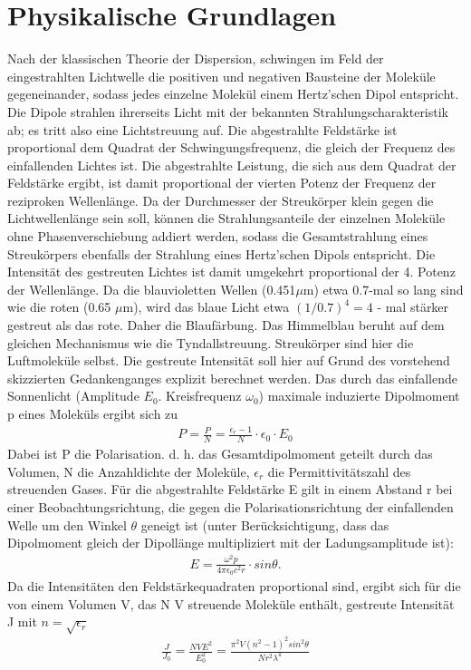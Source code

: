 \section{Physikalische Grundlagen}

Nach der klassischen Theorie der Dispersion, schwingen im Feld der eingestrahlten Lichtwelle die positiven und negativen Bausteine der Moleküle gegeneinander, sodass jedes einzelne Molekül einem Hertz'schen Dipol entspricht. Die Dipole strahlen ihrerseits Licht mit der bekannten Strahlungscharakteristik ab; es tritt also eine Lichtstreuung auf. Die abgestrahlte Feldstärke ist proportional dem Quadrat der Schwingungsfrequenz, die gleich der Frequenz des einfallenden Lichtes ist. Die abgestrahlte Leistung, die sich aus dem Quadrat der Feldstärke ergibt, ist damit proportional der vierten Potenz der Frequenz der reziproken Wellenlänge.
Da der Durchmesser der Streukörper klein gegen die Lichtwellenlänge sein soll, können die Strahlungsanteile der einzelnen Moleküle ohne Phasenverschiebung addiert werden, sodass die Gesamtstrahlung eines Streukörpers ebenfalls der Strahlung eines Hertz'schen Dipols entspricht. Die Intensität des gestreuten Lichtes ist damit umgekehrt proportional der 4. Potenz der Wellenlänge. Da die blauvioletten Wellen (0.451$\mu$m) etwa 0.7-mal so lang sind wie die roten (0.65 $\mu$m), wird das blaue Licht etwa $(1/0.7)^4 =4$ - mal stärker gestreut als das rote. Daher die Blaufärbung.
Das Himmelblau beruht auf dem gleichen Mechanismus wie die Tyndallstreuung.
Streukörper sind hier die Luftmoleküle selbst. Die gestreute Intensität soll hier auf Grund des vorstehend skizzierten Gedankenganges explizit berechnet werden.
Das durch das einfallende Sonnenlicht (Amplitude $E_0$. Kreisfrequenz $\omega_0$) maximale induzierte Dipolmoment p eines Moleküls ergibt sich zu
\begin{align}
P= \frac{P}{N} = \frac{\epsilon_r - 1}{N} \cdot \epsilon_0 \cdot 	E_0
\end{align}
Dabei ist P die Polarisation. d. h. das Gesamtdipolmoment geteilt durch das Volumen, N die Anzahldichte der Moleküle, $\epsilon_r$ die Permittivitätszahl des streuenden Gases. Für die abgestrahlte Feldstärke E gilt in einem Abstand r bei einer Beobachtungsrichtung, die gegen die Polarisationsrichtung der einfallenden Welle um den Winkel $\theta$ geneigt ist (unter Berücksichtigung, dass das Dipolmoment gleich der Dipollänge multipliziert mit der Ladungsamplitude ist):
\begin{align}
E= \frac{\omega^2 p}{4 \pi \epsilon_0 c^2 r} \cdot sin \theta.
\end{align}
Da die Intensitäten den Feldstärkequadraten proportional sind, ergibt sich für die von einem Volumen V, das N V streuende Moleküle enthält, gestreute Intensität J mit $n=\sqrt{\epsilon_r}$
\begin{align}
\frac{J}{J_0}= \frac{NVE^2}{E_0^2} =  \frac{\pi^2V(n^2-1)^2 sin^2\theta}{Nr^2\lambda^4}
\end{align}

